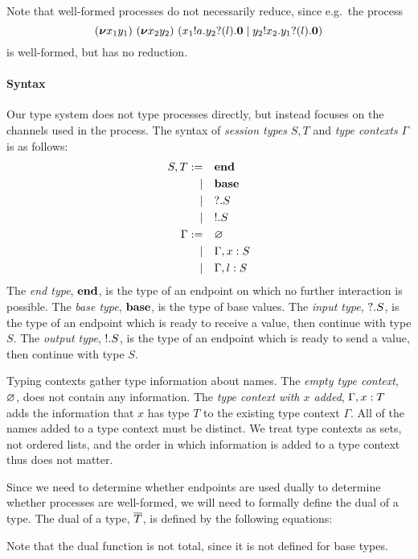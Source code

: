 Note that well-formed processes do not necessarily reduce, since e.g.\ the process
\begin{equation*}
  (\bm{\nu} x_1y_1)~(\bm{\nu} x_2y_2)~(x_1 ! a . y_2 ? (l) . \bm{0} \mid y_2 ! x_2 . y_1 ? (l) . \bm{0})
\end{equation*}
is well-formed, but has no reduction.
\paragraph{Syntax}
Our type system does not type processes directly, but instead focuses on the channels used in the process.
The syntax of \emph{session types} \( S, T \) and \emph{type contexts} \( \Gamma \) is as follows:
\begin{align*}
  S,T := &&& \mathbf{end} \\
  |&&& \mathbf{base} \\
  |&&& {?}.S \\
  |&&& {!}.S \\
  \Gamma := &&& \varnothing \\
  |&&& \Gamma, x : S
        \\
  |&&& \Gamma, l : S
\end{align*}
The \emph{end type}, \( \mathbf{end} \), is the type of an endpoint on which no further interaction is possible.
The \emph{base type}, \( \mathbf{base} \), is the type of base values.
The \emph{input type}, \( {?}.S \), is the type of an endpoint which is ready to receive a value, then continue with type \( S \).
The \emph{output type}, \( {!}.S \), is the type of an endpoint which is ready to send a value, then continue with type \( S \).

Typing contexts gather type information about names.
The \emph{empty type context}, \( \varnothing \), does not contain any information.
The \emph{type context with \( x \) added}, \( \Gamma, x : T \) adds the information that \( x \) has type \( T \) to the existing type context \( \Gamma \).
All of the names added to a type context must be distinct.
We treat type contexts as sets, not ordered lists, and the order in which information is added to a type context thus does not matter.

Since we need to determine whether endpoints are used dually to determine whether processes are well-formed, we will need to formally define the dual of a type.
The dual of a type, \( \overline{T} \), is defined by the following equations:
Note that the dual function is not total, since it is not defined for base types.

